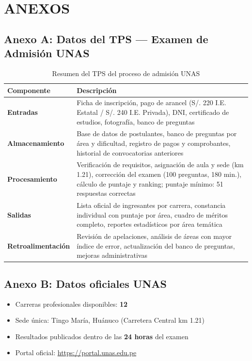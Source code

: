 \documentclass[12pt, a4paper]{report}
\begin{document}
\chapter*{ANEXOS}

\section*{Anexo A: Datos del TPS — Examen de Admisión UNAS}

\begin{table}[H]
  \centering
  \caption{Resumen del TPS del proceso de admisión UNAS}
  \label{tab:tps_resumen}
  \begin{tabular}{>{\bfseries}p{3.8cm} p{8.2cm}}
    \toprule
    Componente & Descripción \\
    \midrule
    Entradas &
      Ficha de inscripción, pago de arancel (S/. 220 I.E. Estatal / S/. 240 I.E. Privada),
      DNI, certificado de estudios, fotografía, banco de preguntas \\
    \midrule
    Almacenamiento &
      Base de datos de postulantes, banco de preguntas por área y dificultad,
      registro de pagos y comprobantes, historial de convocatorias anteriores \\
    \midrule
    Procesamiento &
      Verificación de requisitos, asignación de aula y sede (km 1.21),
      corrección del examen (100 preguntas, 180 min.),
      cálculo de puntaje y ranking; puntaje mínimo: 51 respuestas correctas \\
    \midrule
    Salidas &
      Lista oficial de ingresantes por carrera, constancia individual con puntaje por área,
      cuadro de méritos completo, reportes estadísticos por área temática \\
    \midrule
    Retroalimentación &
      Revisión de apelaciones, análisis de áreas con mayor índice de error,
      actualización del banco de preguntas, mejoras administrativas \\
    \bottomrule
  \end{tabular}
\end{table}

\section*{Anexo B: Datos oficiales UNAS}

\begin{itemize}[noitemsep]
  \item Carreras profesionales disponibles: \textbf{12}
  \item Sede única: Tingo María, Huánuco (Carretera Central km 1.21)
  \item Resultados publicados dentro de las \textbf{24 horas} del examen
  \item Portal oficial: \url{https://portal.unas.edu.pe}
\end{itemize}
\end{document}
